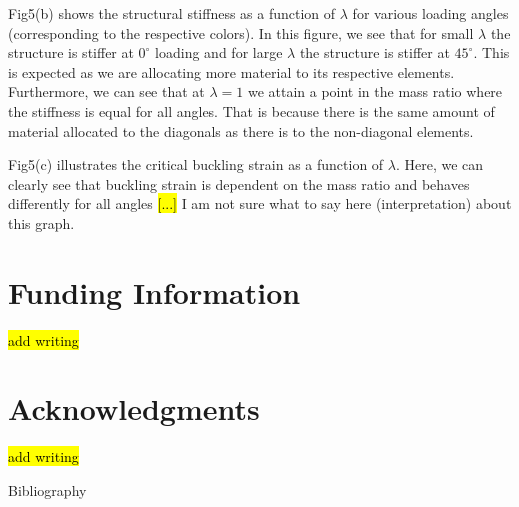 \documentclass[9pt,twocolumn,twoside]{fernandes_paper}
\newcommand{\mf}[1]{\colorbox{blue!10}{\color{color3}#1}}
\begin{document}
{Fig5}(b) shows the structural stiffness as a function of $\lambda$ for various loading angles (corresponding to the respective colors). In this figure, we see that for small $\lambda$ the structure is stiffer at $0^\circ$ loading and for large $\lambda$ the structure is stiffer at $45^\circ$. This is expected as we are allocating more material to its respective elements. Furthermore, we can see that at $\lambda=1$ we attain a point in the mass ratio where the stiffness is equal for all angles. That is because there is the same amount of material allocated to the diagonals as there is to the non-diagonal elements.

{Fig5}(c) illustrates the critical buckling strain as a function of $\lambda$. Here, we can clearly see that buckling strain is dependent on the mass ratio and behaves differently for all angles \hl{[...]} \mf{I am not sure what to say here (interpretation) about this graph.}



\section*{Funding Information}
\hl{add writing}

\section*{Acknowledgments}
\hl{add writing} 





 Bibliography
\nocite{*}


\end{document}
